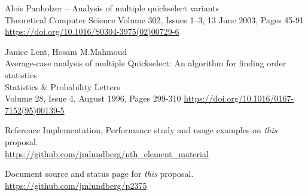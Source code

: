\begin{thebibliography}{9}
Alois Panholzer --
Analysis of multiple quickselect variants\\
Theoretical Computer Science
Volume 302, Issues 1–3, 13 June 2003, Pages 45-91\\
\url{https://doi.org/10.1016/S0304-3975(02)00729-6 }

Janice Lent, Hosam M.Mahmoud\\
Average-case analysis of multiple Quickselect: An algorithm for finding order statistics\\
Statistics \& Probability Letters \\
Volume 28, Issue 4, August 1996, Pages 299-310
\url{https://doi.org/10.1016/0167-7152(95)00139-5}


 Reference Implementation, Performance study and usage examples on \emph{this} proposal.\\
\url{https://github.com/jmlundberg/nth_element_material}

Document source and status page for \emph{this} proposal.\\
\url{https://github.com/jmlundberg/p2375}

\end{thebibliography}
\let\addcontentsline\oldaddcontentsline%


